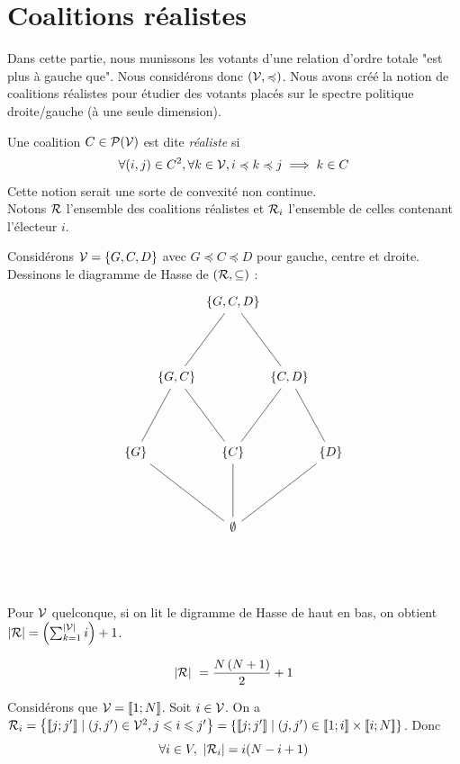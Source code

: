 

\section{Coalitions réalistes}
Dans cette partie, nous munissons les votants d'une relation d'ordre totale "est plus à gauche que". Nous considérons donc $(\mathcal{V}, \preccurlyeq)$.
Nous avons créé la notion de coalitions réalistes pour étudier des votants placés sur le spectre politique droite/gauche (à une seule dimension).

\begin{definition}
	Une coalition $C \in \mathcal{P}(\mathcal{V})$ est dite \textit{réaliste} si
	\begin{equation}
		\forall (i, j) \in C^2, \forall k \in \mathcal{V},
		i \preccurlyeq k \preccurlyeq j \implies k \in C
	\end{equation}
	Cette notion serait une sorte de convexité non continue. \\
	Notons $\mathcal{R}$ l'ensemble des coalitions réalistes et $\mathcal{R}_i$ l'ensemble de celles contenant l'électeur $i$.
\end{definition}

\begin{exemple}
	Considérons $\mathcal{V} = \{G, C, D\}$ avec $G \preccurlyeq C \preccurlyeq D$ pour gauche, centre et droite. Dessinons le diagramme de Hasse de $(\mathcal{R}, \subseteq)$ :
	\begin{equation*}
		\begin{tikzcd}[column sep=0, row sep=1.5cm]
			&& \{G, C, D\} \drar[dash] \dlar[dash] && \\
			& \{G, C\} \drar[dash] \dlar[dash] && \{C, D\} \drar[dash] \dlar[dash] & \\
			\{G\} \arrow[dash]{drr} && \{C\} \dar[dash] && \{D\} \arrow[dash]{dll} \\
			&& \emptyset && \\
		\end{tikzcd}
	\end{equation*}
\end{exemple}

Pour $\mathcal{V}$ quelconque, si on lit le digramme de Hasse de haut en bas, on obtient $|\mathcal{R}| = \left( \sum_{k=1}^{|\mathcal{V}|} i \right) + 1$.

\begin{equation*}
	 |\R| = \frac{N \left(N+1\right)}{2} + 1
\end{equation*}

Considérons que $\mathcal{V} = [\![1;N]\!]$.
Soit $i \in \mathcal{V}$.
On a $\R_i = \left\{ [\![j;j']\!] \;|\; (j, j') \in \V^2, j \leqslant i \leqslant j' \right\} = \left\{ [\![j;j']\!] \;|\; (j, j') \in [\![1;i]\!] \times [\![i;N]\!] \right\}$.
Donc
\begin{equation*}
	\forall i \in V, \
	|\mathcal{R}_i| = i (N-i+1)
\end{equation*}

